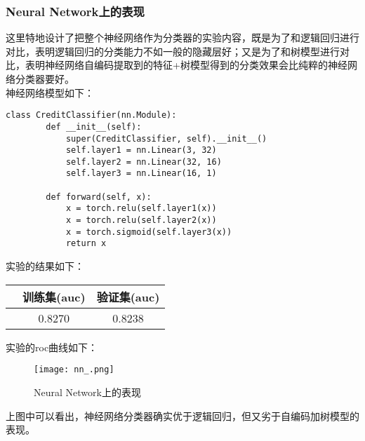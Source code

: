 \subsubsection{Neural Network上的表现}
这里特地设计了把整个神经网络作为分类器的实验内容，既是为了和逻辑回归进行对比，表明逻辑回归的分类能力不如一般的隐藏层好；又是为了和树模型进行对比，表明神经网络自编码提取到的特征+树模型得到的分类效果会比纯粹的神经网络分类器要好。\\

神经网络模型如下：
\begin{lstlisting}[frame=shadowbox]
    class CreditClassifier(nn.Module):
        def __init__(self):
            super(CreditClassifier, self).__init__()
            self.layer1 = nn.Linear(3, 32)
            self.layer2 = nn.Linear(32, 16)
            self.layer3 = nn.Linear(16, 1)
            
        def forward(self, x):
            x = torch.relu(self.layer1(x))
            x = torch.relu(self.layer2(x))
            x = torch.sigmoid(self.layer3(x))
            return x
\end{lstlisting}

实验的结果如下：

\begin{center}
    \begin{tabular}{ccc}
        \hline
         & 训练集(auc) & 验证集(auc) \\
        \hline
         & 0.8270      & 0.8238      \\
        \hline
    \end{tabular}
\end{center}

实验的roc曲线如下：
\begin{figure}[H]
    \centering
    \texttt{[image: nn\_.png]}
    \caption{Neural Network上的表现}
    \label{fig:nn}
\end{figure}

上图中可以看出，神经网络分类器确实优于逻辑回归，但又劣于自编码加树模型的表现。
